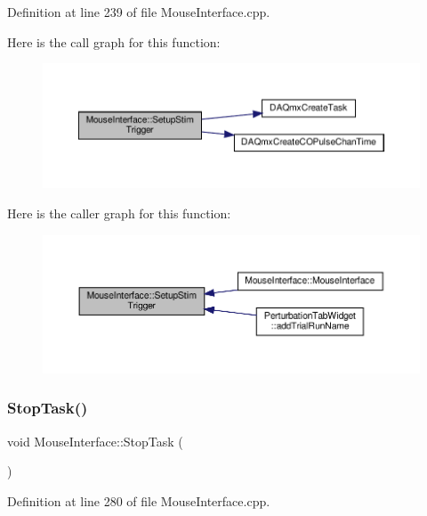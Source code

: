 Definition at line 239 of file Mouse\+Interface.\+cpp.

Here is the call graph for this function\+:
\nopagebreak
\begin{figure}[H]
\begin{center}
\leavevmode
\includegraphics[width=350pt]{class_mouse_interface_a913cdae50fddc45ee67131d762735dbc_cgraph}
\end{center}
\end{figure}
Here is the caller graph for this function\+:
\nopagebreak
\begin{figure}[H]
\begin{center}
\leavevmode
\includegraphics[width=350pt]{class_mouse_interface_a913cdae50fddc45ee67131d762735dbc_icgraph}
\end{center}
\end{figure}
\mbox{\label{class_mouse_interface_a818fc677dc9766a611bb847fdbd9589e}} 
\subsubsection{\texorpdfstring{Stop\+Task()}{StopTask()}}
{\footnotesize\ttfamily void Mouse\+Interface\+::\+Stop\+Task (\begin{DoxyParamCaption}{ }\end{DoxyParamCaption})}



Definition at line 280 of file Mouse\+Interface.\+cpp.

